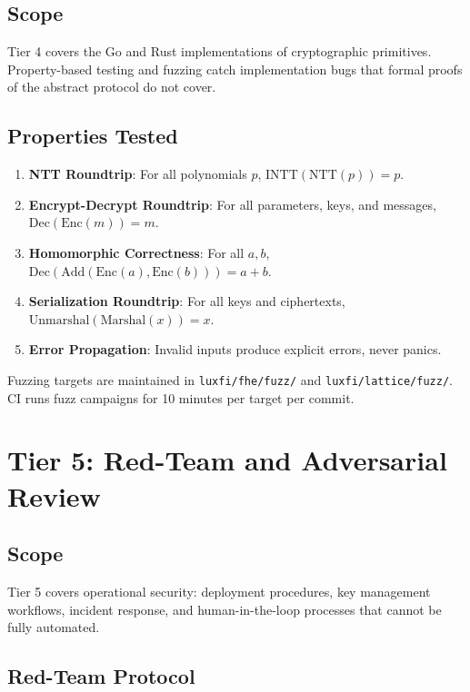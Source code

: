 \documentclass[11pt]{article}
\begin{document}
\subsection{Scope}

Tier 4 covers the Go and Rust implementations of cryptographic primitives. Property-based testing and fuzzing catch implementation bugs that formal proofs of the abstract protocol do not cover.

\subsection{Properties Tested}

\begin{enumerate}
\item \textbf{NTT Roundtrip}: For all polynomials $p$, $\text{INTT}(\text{NTT}(p)) = p$.
\item \textbf{Encrypt-Decrypt Roundtrip}: For all parameters, keys, and messages, $\text{Dec}(\text{Enc}(m)) = m$.
\item \textbf{Homomorphic Correctness}: For all $a, b$, $\text{Dec}(\text{Add}(\text{Enc}(a), \text{Enc}(b))) = a + b$.
\item \textbf{Serialization Roundtrip}: For all keys and ciphertexts, $\text{Unmarshal}(\text{Marshal}(x)) = x$.
\item \textbf{Error Propagation}: Invalid inputs produce explicit errors, never panics.
\end{enumerate}

Fuzzing targets are maintained in \texttt{luxfi/fhe/fuzz/} and \texttt{luxfi/lattice/fuzz/}. CI runs fuzz campaigns for 10 minutes per target per commit.

\section{Tier 5: Red-Team and Adversarial Review}

\subsection{Scope}

Tier 5 covers operational security: deployment procedures, key management workflows, incident response, and human-in-the-loop processes that cannot be fully automated.

\subsection{Red-Team Protocol}
\end{document}
